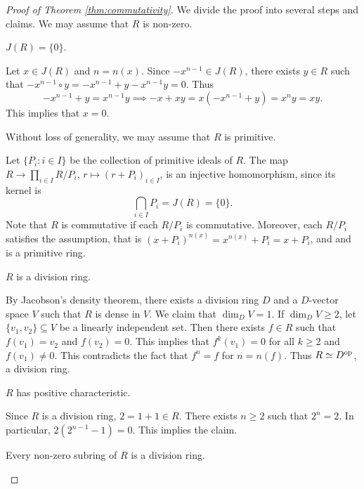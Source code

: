 \begin{proof}[Proof of Theorem \ref{thm:commutativity}]
    We divide the proof into several steps and claims. We may assume that 
    $R$ is non-zero. 
    
    \begin{claim}
        $J(R)=\{0\}$. 
    \end{claim}
    
    Let $x\in J(R)$ and $n=n(x)$. Since $-x^{n-1}\in J(R)$, 
    there exists $y\in R$ such that $-x^{n-1}\circ y=-x^{n-1}+y-x^{n-1}y=0$. Thus
    \[
    -x^{n-1}+y=x^{n-1}y\implies
    -x+xy=x(-x^{n-1}+y)=x^ny=xy.
    \]
    This implies that $x=0$.
    
    \begin{claim}
        Without loss of generality, we may assume that $R$ is primitive. 
    \end{claim}
	
	Let $\{P_i:i\in I\}$ be the collection of primitive ideals of $R$. 
	The map 
	$R\to \prod_{i\in I}R/P_i$, $r\mapsto (r+P_i)_{i\in I}$, 
	is an injective homomorphism, since
	its kernel is 
	\[
	\bigcap_{i\in I} P_i=J(R)=\{0\}.
	\]
	Note that
	$R$ is commutative if each $R/P_i$ is commutative.        Moreover, 
	each $R/P_i$ 
	satisfies the assumption, that is 
	$(x+P_i)^{n(x)}=x^{n(x)}+P_i=x+P_i$, and 
	and is a primitive ring. 
	
    \begin{claim}
        $R$ is a division ring. 
    \end{claim}

    By Jacobson's density theorem,
    there exists a division ring $D$ and 
    a $D$-vector space $V$ such that 
    $R$ is dense in $V$. We claim that $\dim_DV=1$. If $\dim_DV\geq 2$, 
    let $\{v_1,v_2\}\subseteq V$ be a linearly independent set. Then
    there exists $f\in R$ such that $f(v_1)=v_2$ and $f(v_2)=0$. This implies
    that $f^{k}(v_1)=0$ for all $k\geq 2$ and $f(v_1)\ne 0$. This contradicts
    the fact that $f^{n}=f$ for $n=n(f)$. Thus $R\simeq D^{\operatorname{op}}$, 
    a division ring. 
    
    \begin{claim}
        $R$ has positive characteristic. 
    \end{claim}

    Since $R$ is a division ring, $2=1+1\in R$. There exists $n\geq2$ 
    such that $2^n=2$. In particular, 
    $2(2^{n-1}-1)=0$. This implies the claim. 
    
    \begin{claim}
        Every non-zero subring of $R$ is a division ring. 
    \end{claim}
    

\end{proof}
